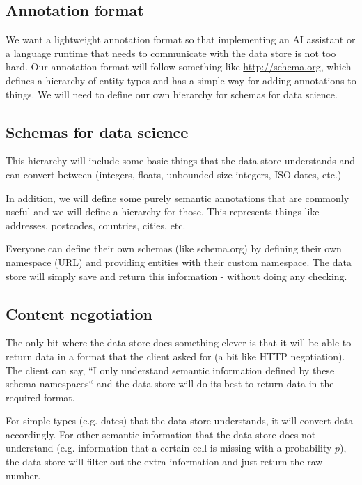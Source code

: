 \documentclass[sigplan,preprint,10pt]{acmart}\settopmatter{printfolios=true,printccs=false,printacmref=false}
\theoremstyle{plain}
\theoremstyle{definition}
\begin{document}
\subsection{Annotation format}
{\color{red}
We want a lightweight annotation format so that implementing an AI assistant or a language
runtime that needs to communicate with the data store is not too hard.
Our annotation format will follow something like \url{http://schema.org}, which defines
a hierarchy of entity types and has a simple way for adding annotations to things.
We will need to define our own hierarchy for schemas for data science.
}

\subsection{Schemas for data science}
{\color{red}
This hierarchy will include some basic things that the data store understands and can 
convert between (integers, floats, unbounded size integers, ISO dates, etc.)

In addition, we will define some purely semantic annotations that are commonly useful and 
we will define a hierarchy for those. This represents things like addresses, postcodes, countries,
cities, etc.

Everyone can define their own schemas (like schema.org) by defining their own namespace (URL)
and providing entities with their custom namespace. The data store will simply save and return
this information - without doing any checking.}

\subsection{Content negotiation}
{\color{red}
The only bit where the data store does something clever is that it will be able to return data
in a format that the client asked for (a bit like HTTP negotiation). The client can say, ``I only
understand semantic information defined by these schema namespaces`` and the data store will do
its best to return data in the required format.

For simple types (e.g. dates) that the data store understands, it will convert data accordingly.
For other semantic information that the data store does not understand (e.g. information that
a certain cell is missing with a probability $p$), the data store will filter out the extra
information and just return the raw number.
}



\end{document}
